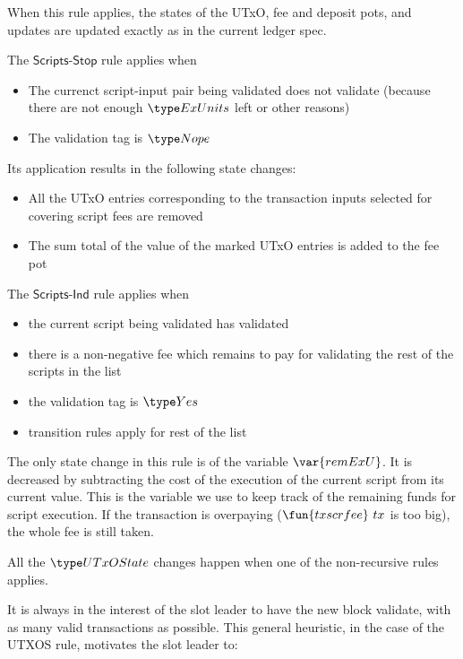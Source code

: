 When this rule applies, the states of the UTxO, fee
  and deposit pots, and updates are updated exactly as in the current
  ledger spec.

The $\mathsf{Scripts\mbox{-}Stop}$ rule applies when

\begin{itemize}
  \item The currenct script-input pair being validated does not validate
  (because there are not enough $\ExUnits$ left or other reasons)
  \item The validation tag is $\Nope$
\end{itemize}

Its application results in the following state changes:

\begin{itemize}
  \item All the
  UTxO entries corresponding to the transaction inputs selected for covering
  script fees are removed

  \item The sum total of the value of the marked UTxO entries
  is added to the fee pot
\end{itemize}

The $\mathsf{Scripts\mbox{-}Ind}$ rule applies when

\begin{itemize}
  \item the current script being validated has validated
  \item there is a non-negative fee which remains to pay for validating
  the rest of the scripts in the list
  \item the validation tag is $\Yes$
  \item transition rules apply for rest of the list
\end{itemize}

The only state change in this rule is of the variable $\var{remExU}$.
It is decreased by subtracting the cost of the execution of the
current script from its current value.
This is the variable we use to keep track of the remaining funds for
script execution. If the transaction is overpaying ($\fun{txscrfee}~{tx}$
is too big), the whole fee is still taken.

All the $\UTxOState$ changes happen when one of the non-recursive rules
applies.

It is always in the interest of the slot leader to have the new block validate,
with as many valid transactions as possible. This general heuristic,
in the case of the UTXOS rule, motivates the
slot leader to:

